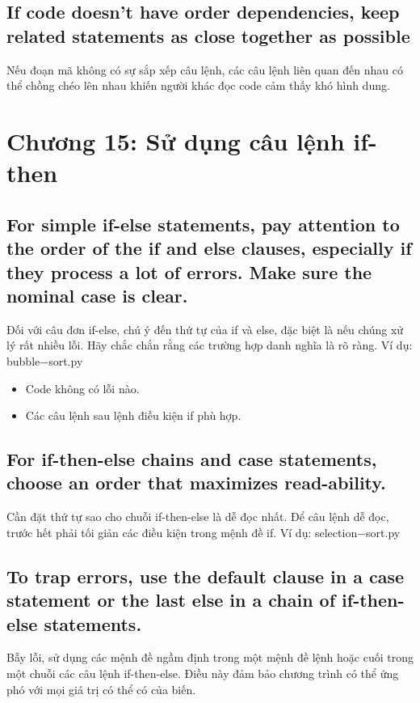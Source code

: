 \documentclass{article}
\begin{document}
    \subsection{If code doesn't have order dependencies, keep related statements as close together as possible}
    Nếu đoạn mã không có sự sắp xếp câu lệnh, các câu lệnh liên quan đến nhau có thể chồng chéo lên nhau khiến người khác đọc code cảm thấy khó hình dung.

\section{Chương 15: Sử dụng câu lệnh if-then}
    \subsection{For simple if-else statements, pay attention to the order of the if and else clauses, especially if they process a lot of errors. Make sure the nominal case is clear.}
    Đối với câu đơn if-else, chú ý đến thứ tự của if và else, đặc biệt là nếu chúng xử lý rất nhiều lỗi. Hãy chắc chắn rằng các trường hợp danh nghĩa là rõ ràng.
    Ví dụ: bubble$-$sort.py
    
    \begin{itemize}
        \item Code không có lỗi nào.
        \item Các câu lệnh sau lệnh điều kiện if phù hợp.
    \end{itemize}
    
    \subsection{For if-then-else chains and case statements, choose an order that maximizes read-ability.}
    Cần đặt thứ tự sao cho chuỗi if-then-else là dễ đọc nhất. Để câu lệnh dễ đọc, trước hết phải tối giản các điều kiện trong mệnh đề if.
    Ví dụ: selection$-$sort.py
    
    
    \subsection{To trap errors, use the default clause in a case statement or the last else in a chain of if-then-else statements.}
    
    Bẫy lỗi, sử dụng các mệnh đề ngầm định trong một mệnh đề lệnh hoặc cuối  trong một chuỗi các câu lệnh if-then-else. Điều này đảm bảo chương trình có thể ứng phó với mọi giá trị có thể có của biến.
    
\end{document}

